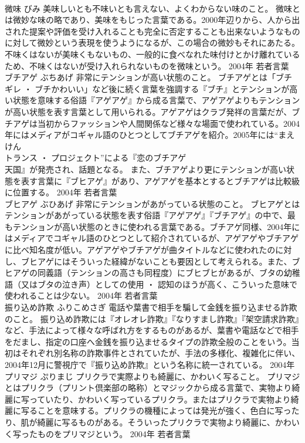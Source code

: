 \documentclass[8pt]{extreport}
\begin{document}
\begin{CJK}{UTF8}{min}
\\	微味	びみ	美味しいとも不味いとも言えない、よくわからない味のこと。	微味とは微妙な味の略であり、美味をもじった言葉である。2000年辺りから、人から出された提案や評価を受け入れることも完全に否定することも出来ないようなものに対して微妙という表現を使うようになるが、この場合の微妙もそれにあたる。不味くはないが美味くもないもの、一般的に食べなれた味付けとかけ離れているため、不味くはないが受け入れられないものを微味という。	2004年	若者言葉	
\\	ブチアゲ	ぶちあげ	非常にテンションが高い状態のこと。	ブチアゲとは「ブチギレ ・ ブチかわいい」など後に続く言葉を強調する『ブチ』とテンションが高い状態を意味する俗語『アゲアゲ』から成る言葉で、アゲアゲよりもテンションが高い状態を表す言葉として用いられる。アゲアゲはクラブ発祥の言葉だが、ブチアゲは当初からファッションや人間関係など様々な場面で使われている。2004年にはメディアがコギャル語のひとつとしてブチアゲを紹介。2005年には“まえけん
\\	トランス ・ プロジェクト”による『恋のブチアゲ
\\	天国』が発売され、話題となる。 また、ブチアゲより更にテンションが高い状態を表す言葉に『ブヒアゲ』があり、アゲアゲを基本とするとブチアゲは比較級に位置する。	2004年	若者言葉	
\\	ブヒアゲ	ぶひあげ	非常にテンションがあがっている状態のこと。	ブヒアゲとはテンションがあがっている状態を表す俗語『アゲアゲ』『ブチアゲ』の中で、最もテンションが高い状態のときに使われる言葉である。ブチアゲ同様、2004年にはメディアでコギャル語のひとつとして紹介されているが、アゲアゲやブチアゲに比べ知名度が低い。アゲアゲやブチアゲが曲タイトルなどに使われたのに対し、ブヒアゲにはそういった経緯がないことも要因として考えられる。また、ブヒアゲの同義語（テンションの高さも同程度）にブヒブヒがあるが、ブタの幼稚語（又はブタの泣き声）としての使用 ・ 認知のほうが高く、こういった意味で使われることは少ない。	2004年	若者言葉	
\\	振り込め詐欺	ふりこめさぎ	電話や葉書で相手を騙して金銭を振り込ませる詐欺のこと。	振り込め詐欺には『オレオレ詐欺』『なりすまし詐欺』『架空請求詐欺』など、手法によって様々な呼ばれ方をするものがあるが、葉書や電話などで相手をだまし、指定の口座へ金銭を振り込ませるタイプの詐欺全般のことをいう。当初はそれぞれ別名称の詐欺事件とされていたが、手法の多様化、複雑化に伴い、2004年12月に警視庁で『振り込め詐欺』という名称に統一されている。	2004年	
\\	プリマジ	ぷりまじ	プリクラで実際よりも綺麗に、かわいく写ること。	プリマジとはプリクラ（プリント倶楽部の略称）とマジックから成る言葉で、実物より綺麗に写っていたり、かわいく写っているプリクラ。またはプリクラで実物より綺麗に写ることを意味する。プリクラの機種によっては発光が強く、色白に写ったり、肌が綺麗に写るものがある。そういったプリクラで実物より綺麗に、かわいく写ったものをプリマジという。	2004年	若者言葉	

\end{CJK}
\end{document}
